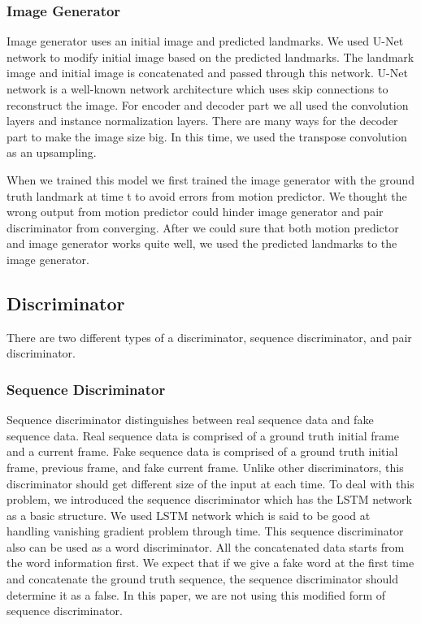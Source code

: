 \documentclass[10pt,twocolumn,letterpaper]{article}
\begin{document}
\subsubsection{Image Generator}

Image generator uses an initial image and predicted landmarks. We used U-Net network to modify initial image based on the predicted landmarks. The landmark image and initial image is concatenated and passed through this network. U-Net network is a well-known network architecture which uses skip connections to reconstruct the image. For encoder and decoder part we all used the convolution layers and instance normalization layers. There are many ways for the decoder part to make the image size big. In this time, we used the transpose convolution as an upsampling.

When we trained this model we first trained the image generator with the ground truth landmark at time t to avoid errors from motion predictor. We thought the wrong output from motion predictor could hinder image generator and pair discriminator from converging. After we could sure that both motion predictor and image generator works quite well, we used the predicted landmarks to the image generator.
\subsection{Discriminator}
 There are two different types of a discriminator, sequence discriminator, and pair discriminator.
\subsubsection{Sequence Discriminator}
Sequence discriminator distinguishes between real sequence data and fake sequence data. Real sequence data is comprised of a ground truth initial frame and a current frame. Fake sequence data is comprised of a ground truth initial frame, previous frame, and fake current frame. Unlike other discriminators, this discriminator should get different size of the input at each time. To deal with this problem, we introduced the sequence discriminator which has the LSTM network as a basic structure. We used LSTM network which is said to be good at handling vanishing gradient problem through time.
This sequence discriminator also can be used as a word discriminator. All the concatenated data starts from the word information first. We expect that if we give a fake word at the first time and concatenate the ground truth sequence, the sequence discriminator should determine it as a false. In this paper, we are not using this modified form of sequence discriminator.
\end{document}
